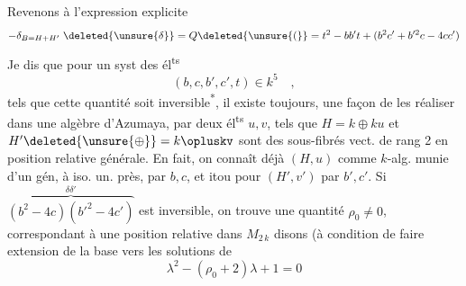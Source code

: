Revenons à l'expression explicite
\[
-\delta_{B=H+H'}\;\deleted{\unsure{\delta}}=Q\deleted{\unsure{(}}=t^2-bb't+(b^2c'+b'^2c-4cc')
\]
Je dis que pour un syst des él\textsuperscript{ts}
\[
(b,c,b',c',t)\in k^5\quad,
\]
tels que cette quantité soit inversible\textsuperscript{*},
 il existe toujours,  une façon de les
 réaliser dans une algèbre d'Azumaya, par deux él\textsuperscript{ts} $u,v$,  tels que $H=k\oplus ku$ et $H'\deleted{\unsure{\oplus}}=k\opluskv$ sont des sous-fibrés vect. de rang 2 en position relative générale. En fait, on connaît déjà $(H,u)$  comme $k$-alg. munie d'un gén, à iso. un. près, par $b,c$, et itou pour $(H',v')$ par $b',c'$. Si $\overbrace{(b^2-4c)(b'^2-4c')}^{\delta\delta'}$ est
 inversible, on trouve une quantité $\rho_0\ne0$, correspondant à  une position relative dans $M_{2\,k}$ disons (à condition de faire extension de la base vers les solutions de
\[
\lambda^2-(\rho_0+2)\lambda+1=0
\]
